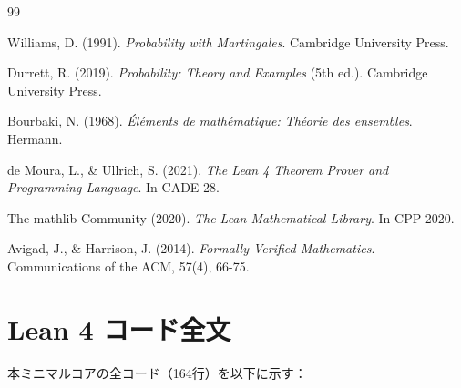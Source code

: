 \documentclass[a4paper,12pt]{ltjsarticle}
\theoremstyle{definition}
\begin{document}
\begin{center}
\end{center}

\begin{thebibliography}{99}

Williams, D. (1991).
\textit{Probability with Martingales}.
Cambridge University Press.

Durrett, R. (2019).
\textit{Probability: Theory and Examples} (5th ed.).
Cambridge University Press.

Bourbaki, N. (1968).
\textit{Éléments de mathématique: Théorie des ensembles}.
Hermann.

de Moura, L., \& Ullrich, S. (2021).
\textit{The Lean 4 Theorem Prover and Programming Language}.
In CADE 28.

The mathlib Community (2020).
\textit{The Lean Mathematical Library}.
In CPP 2020.

Avigad, J., \& Harrison, J. (2014).
\textit{Formally Verified Mathematics}.
Communications of the ACM, 57(4), 66-75.

\end{thebibliography}

\appendix

\section{Lean 4 コード全文}

本ミニマルコアの全コード（164行）を以下に示す：
\end{document}
